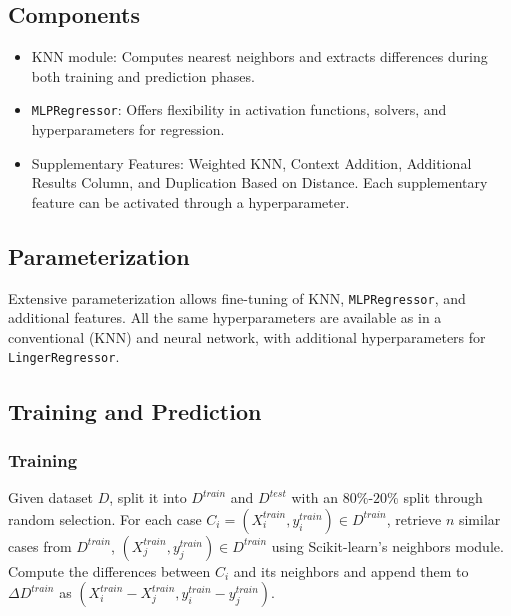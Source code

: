 \documentclass[a4paper, 12pt]{report}
\begin{document}
\subsection{Components}
\begin{itemize}
    \item KNN module: Computes nearest neighbors and extracts differences during both training and prediction phases.
    \item \texttt{MLPRegressor}: Offers flexibility in activation functions, solvers, and hyperparameters for regression.
    \item Supplementary Features: Weighted KNN, Context Addition, Additional Results Column, and Duplication Based on Distance.
     Each supplementary feature can be activated through a hyperparameter.
\end{itemize}

\subsection{Parameterization}
Extensive parameterization allows fine-tuning of KNN, \texttt{MLPRegressor}, and additional features. 
All the same hyperparameters are available as in a conventional (KNN) and neural network, with additional hyperparameters for \texttt{LingerRegressor}.

\subsection{Training and Prediction}
\subsubsection{Training}
Given dataset $D$, split it into $D^{train}$ and $D^{test}$ with an $80\%$-$20\%$ split through random selection. 
For each case $C_i = (X^{train}_i, y^{train}_i) \in D^{train}$, retrieve $n$ similar cases from $D^{train}$, $(X^{train}_j, y^{train}_j) \in D^{train}$ 
using Scikit-learn's neighbors module. Compute the differences between $C_i$ and its neighbors and append them to $\Delta D^{train}$ as $(X^{train}_i-X^{train}_j, y^{train}_i-y^{train}_j)$.
\end{document}
